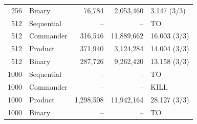 \begin{longtable}{rlrrl}
256 & Binary & 76,784 & 2,053,460 & 3.147 (3/3) \\
512 & Sequential & -- & -- & TO \\
512 & Commander & 316,546 & 11,889,662 & 16.003 (3/3) \\
512 & Product & 371,940 & 3,124,284 & 14.004 (3/3) \\
512 & Binary & 287,726 & 9,262,420 & 13.158 (3/3) \\
1000 & Sequential & -- & -- & TO \\
1000 & Commander & -- & -- & KILL \\
1000 & Product & 1,298,508 & 11,942,164 & 28.127 (3/3) \\
1000 & Binary & -- & -- & TO \\
\end{longtable}
